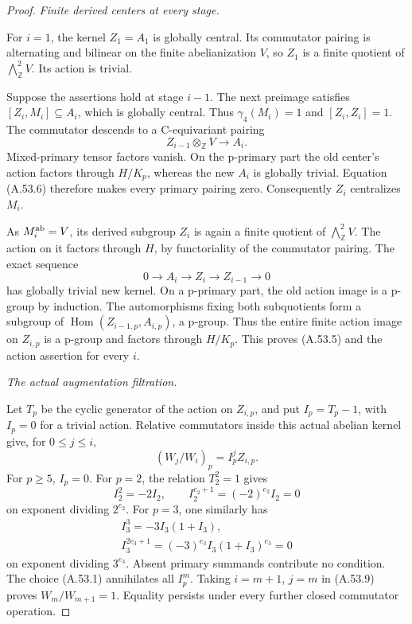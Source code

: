 \begin{proof}
\emph{Finite derived centers at every stage.}\par
For \(i=1\), the kernel \(Z_1=A_1\) is
globally central. Its commutator pairing is
alternating and bilinear on the finite
abelianization \(V\), so \(Z_1\) is a
finite quotient of
\(\bigwedge^2_{\mathbb Z}V\). Its action is
trivial.

Suppose the assertions hold at stage \(i-1\).
The next preimage satisfies
\([Z_i,M_i]\subseteq A_i\), which is globally
central. Thus \(\gamma_4(M_i)=1\) and
\([Z_i,Z_i]=1\). The commutator descends to
a C-equivariant pairing
\[
                       Z_{i-1}\otimes_{\mathbb Z}V
                                  \longrightarrow A_i.
                                                               \tag{A.53.8}
\]
Mixed-primary tensor factors vanish. On the
p-primary part the old center's action factors
through \(H/K_p\), whereas the new \(A_i\)
is globally trivial. Equation (A.53.6)
therefore makes every primary pairing zero.
Consequently \(Z_i\) centralizes \(M_i\).

As \(M_i^{\rm ab}=V\), its derived subgroup
\(Z_i\) is again a finite quotient of
\(\bigwedge^2_{\mathbb Z}V\). The action on
it factors through \(H\), by functoriality
of the commutator pairing. The exact sequence
\[
                   0\longrightarrow A_i
                    \longrightarrow Z_i
                    \longrightarrow Z_{i-1}
                    \longrightarrow0
\]
has globally trivial new kernel. On a p-primary
part, the old action image is a p-group by
induction. The automorphisms fixing both
subquotients form a subgroup of
\(\operatorname{Hom}(Z_{i-1,p},A_{i,p})\),
a p-group. Thus the entire finite action image
on \(Z_{i,p}\) is a p-group and factors through
\(H/K_p\). This proves (A.53.5) and the
action assertion for every \(i\).

\emph{The actual augmentation filtration.}\par
Let \(T_p\) be the cyclic generator of the
action on \(Z_{i,p}\), and put \(I_p=T_p-1\),
with \(I_p=0\) for a trivial action.
Relative commutators inside this actual
abelian kernel give, for \(0\leq j\leq i\),
\[
                         (W_j/W_i)_p=I_p^j Z_{i,p}.
                                                               \tag{A.53.9}
\]
For \(p\geq5\), \(I_p=0\). For \(p=2\),
the relation \(T_2^2=1\) gives
\[
 I_2^2=-2I_2,
 \qquad I_2^{e_2+1}=(-2)^{e_2}I_2=0
                                                               \tag{A.53.10}
\]
on exponent dividing \(2^{e_2}\).
For \(p=3\), one similarly has
\[
\begin{gathered}
 I_3^3=-3I_3(1+I_3),\\
 I_3^{2e_3+1}=(-3)^{e_3}I_3(1+I_3)^{e_3}=0
\end{gathered}                                                 \tag{A.53.11}
\]
on exponent dividing \(3^{e_3}\).
Absent primary summands contribute no condition.
The choice (A.53.1) annihilates all \(I_p^m\).
Taking \(i=m+1\), \(j=m\) in (A.53.9)
proves \(W_m/W_{m+1}=1\). Equality persists
under every further closed commutator operation.


\end{proof}
